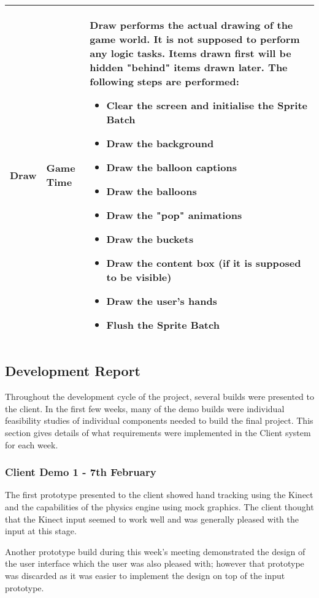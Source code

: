 \begin{table}[H]
\begin{tabular}{|p{3cm}|p{3.6cm}|p{9cm}|}
Draw & Game Time &
Draw performs the actual drawing of the game world. It is not supposed to 
perform any logic tasks. Items drawn first will be hidden "behind" items drawn
later. The following steps are performed:
\begin{itemize}
	\item{Clear the screen and initialise the Sprite Batch}
	\item{Draw the background}
	\item{Draw the balloon captions}
	\item{Draw the balloons}
	\item{Draw the "pop" animations}
	\item{Draw the buckets}
	\item{Draw the content box (if it is supposed to be visible)}
	\item{Draw the user's hands}
	\item{Flush the Sprite Batch}
\end{itemize}
\\ \hline
\end{tabular}
\end{table}

\subsection{Development Report}
Throughout the development cycle of the project, several builds were presented
to the client. In the first few weeks, many of the demo builds were individual
feasibility studies of individual components needed to build the final project.
This section gives details of what requirements were implemented in the Client
system for each week.

\subsubsection{Client Demo 1 - 7th February}
The first prototype presented to the client showed hand tracking using the
Kinect and the capabilities of the physics engine using mock graphics. The
client thought that the Kinect input seemed to work well and was generally
pleased with the input at this stage.

Another prototype build during this week's meeting demonstrated the design of
the user interface which the user was also pleased with; however that prototype
was discarded as it was easier to implement the design on top of the input
prototype.

